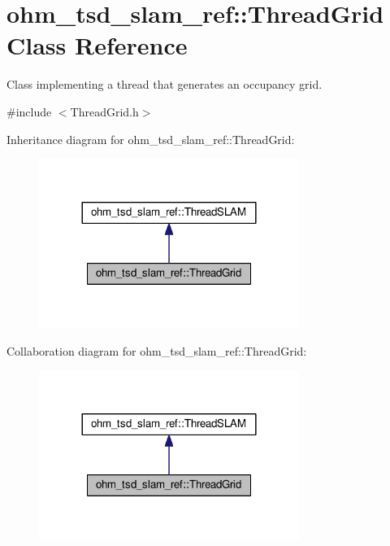 \hypertarget{classohm__tsd__slam__ref_1_1ThreadGrid}{\section{ohm\-\_\-tsd\-\_\-slam\-\_\-ref\-:\-:Thread\-Grid Class Reference}
\label{classohm__tsd__slam__ref_1_1ThreadGrid}
}


Class implementing a thread that generates an occupancy grid.  




{\ttfamily \#include $<$Thread\-Grid.\-h$>$}



Inheritance diagram for ohm\-\_\-tsd\-\_\-slam\-\_\-ref\-:\-:Thread\-Grid\-:\nopagebreak
\begin{figure}[H]
\begin{center}
\leavevmode
\includegraphics[width=240pt]{classohm__tsd__slam__ref_1_1ThreadGrid__inherit__graph}
\end{center}
\end{figure}


Collaboration diagram for ohm\-\_\-tsd\-\_\-slam\-\_\-ref\-:\-:Thread\-Grid\-:\nopagebreak
\begin{figure}[H]
\begin{center}
\leavevmode
\includegraphics[width=240pt]{classohm__tsd__slam__ref_1_1ThreadGrid__coll__graph}
\end{center}
\end{figure}
